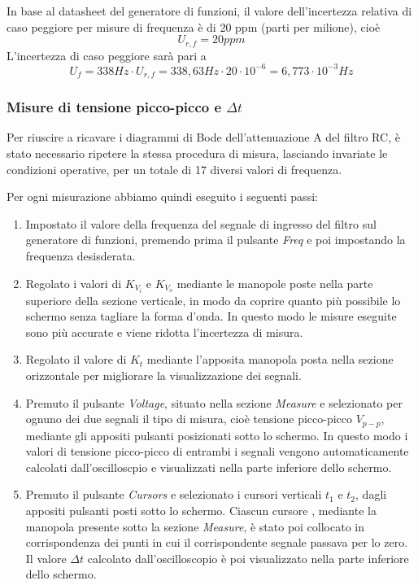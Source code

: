 In base al datasheet del generatore di funzioni, il valore dell'incertezza relativa di caso peggiore per misure di frequenza è di 20 ppm (parti per milione), cioè 
\[U_{r,f} = 20 ppm\]
L'incertezza di caso peggiore sarà pari a
\[U_f = 338 Hz\cdot U_{r,f} = 338,63Hz \cdot 20 \cdot 10^{-6} = 6,773\cdot10^{-3}Hz\]

\clearpage
\subsubsection{Misure di tensione picco-picco e $\Delta t$}
Per riuscire a ricavare i diagrammi di Bode dell'attenuazione A del filtro RC, è stato necessario ripetere la stessa procedura di misura, lasciando invariate le condizioni operative, per un totale di 17 diversi valori di frequenza.

Per ogni misurazione abbiamo quindi eseguito i seguenti passi:
\begin{enumerate}
    \item Impostato il valore della frequenza del segnale di ingresso del filtro  sul generatore di funzioni, premendo prima il pulsante \emph{Freq} e poi impostando la frequenza desisderata.
    \item Regolato i valori di $K_{V_i}$ e $K_{V_o}$ mediante le manopole poste nella parte superiore della sezione verticale, in modo da coprire quanto più possibile lo schermo senza tagliare la forma d'onda. In questo modo le misure eseguite sono più accurate e viene ridotta l'incertezza di misura.
    \item Regolato il valore di $K_t$ mediante l'apposita manopola posta nella sezione orizzontale per migliorare la visualizzazione dei segnali.
    \item Premuto il pulsante \emph{Voltage}, situato nella sezione \emph{Measure} e selezionato per ognuno dei due segnali il tipo di misura, cioè tensione picco-picco $V_{p-p}$, mediante gli appositi pulsanti posizionati sotto lo schermo.
    In questo modo i valori di tensione picco-picco di entrambi i segnali vengono automaticamente calcolati dall'oscilloscpio e visualizzati nella parte inferiore dello schermo.
    \item Premuto il pulsante \emph{Cursors} e selezionato i cursori verticali $t_1$ e $t_2$, dagli appositi pulsanti posti sotto lo schermo. Ciascun cursore , mediante la manopola presente sotto la sezione \emph{Measure}, è stato poi collocato in corrispondenza dei punti in cui il corrispondente segnale passava per lo zero. Il valore $\Delta t$  calcolato dall'oscilloscopio è poi visualizzato nella parte inferiore dello schermo. 
    
\end{enumerate}

